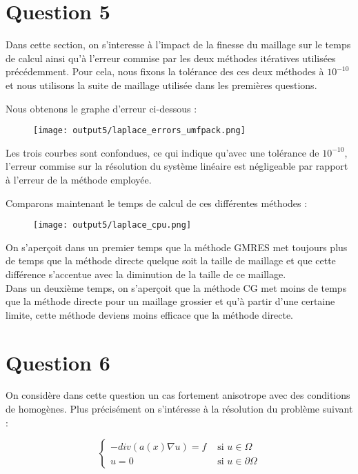 \documentclass[11pt,a4paper]{report}
\begin{document}
			\section*{Question 5}
				
				Dans cette section, on s'interesse à l'impact de la finesse du maillage sur le temps de calcul ainsi qu'à l'erreur commise par les deux méthodes itératives utilisées précédemment.
				Pour cela, nous fixons la tolérance des ces deux méthodes à $10^{-10}$ et nous utilisons la suite de maillage utilisée dans les premières questions.

				Nous obtenons le graphe d'erreur ci-dessous :

				\begin{figure}[H]
					\centering
					\texttt{[image: output5/laplace\_errors\_umfpack.png]}
				\end{figure}

				Les trois courbes sont confondues, ce qui indique qu'avec une tolérance de $10^{-10}$, l'erreur commise sur la résolution du système linéaire est négligeable par rapport à l'erreur de la méthode employée.

				Comparons maintenant le temps de calcul de ces différentes méthodes :
				
				\begin{figure}[H]
					\centering
					\texttt{[image: output5/laplace\_cpu.png]}
				\end{figure}

				On s'aperçoit dans un premier temps que la méthode GMRES met toujours plus de temps que la méthode directe quelque soit la taille de maillage et que cette différence s'accentue avec la diminution de la taille de ce maillage.\\
				
				Dans un deuxième temps, on s'aperçoit que la méthode CG met moins de temps que la méthode directe pour un maillage grossier et qu'à partir d'une certaine limite, cette méthode deviens moins efficace que la méthode directe.
		
		\section*{Question 6}

				On considère dans cette question un cas fortement anisotrope avec des conditions de  homogènes. Plus précisément on s'intéresse à la résolution du problème suivant : 
				
				\[
				\left\{
				\begin{array}{ll}
				- div(a(x)\nabla u) = f & \mbox{ si } u \in \Omega \\
				u = 0 & \mbox{ si } u \in \partial\Omega
				\end{array}
				\right.
				\]
				
\end{document}
